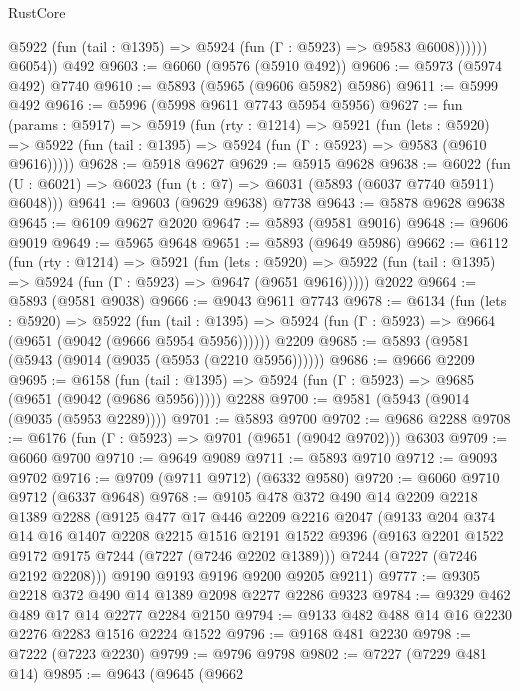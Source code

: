 \begin{lexlean}{RustCore}
\begin{coremodule}
              @5922 (fun (tail : @1395) => @5924 (fun (Γ : @5923) => @9583 @6008))))))
        @6054))
    @492
@9603 := @6060 (@9576 (@5910 @492))
@9606 := @5973 (@5974 @492) @7740
@9610 := @5893 (@5965 (@9606 @5982) @5986)
@9611 := @5999 @492
@9616 := @5996 (@5998 @9611 @7743 @5954 @5956)
@9627 := fun (params : @5917) =>
  @5919
    (fun (rty : @1214) =>
    @5921
      (fun (lets : @5920) =>
      @5922 (fun (tail : @1395) => @5924 (fun (Γ : @5923) => @9583 (@9610 @9616)))))
@9628 := @5918 @9627
@9629 := @5915 @9628
@9638 := @6022 (fun (U : @6021) => @6023 (fun (t : @7) => @6031 (@5893 (@6037 @7740 @5911) @6048)))
@9641 := @9603 (@9629 @9638) @7738
@9643 := @5878 @9628 @9638
@9645 := @6109 @9627 @2020
@9647 := @5893 (@9581 @9016)
@9648 := @9606 @9019
@9649 := @5965 @9648
@9651 := @5893 (@9649 @5986)
@9662 := @6112
    (fun (rty : @1214) =>
    @5921
      (fun (lets : @5920) =>
      @5922 (fun (tail : @1395) => @5924 (fun (Γ : @5923) => @9647 (@9651 @9616)))))
    @2022
@9664 := @5893 (@9581 @9038)
@9666 := @9043 @9611 @7743
@9678 := @6134
    (fun (lets : @5920) =>
    @5922
      (fun (tail : @1395) => @5924 (fun (Γ : @5923) => @9664 (@9651 (@9042 (@9666 @5954 @5956))))))
    @2209
@9685 := @5893 (@9581 (@5943 (@9014 (@9035 (@5953 (@2210 @5956))))))
@9686 := @9666 @2209
@9695 := @6158
    (fun (tail : @1395) => @5924 (fun (Γ : @5923) => @9685 (@9651 (@9042 (@9686 @5956)))))
    @2288
@9700 := @9581 (@5943 (@9014 (@9035 (@5953 @2289))))
@9701 := @5893 @9700
@9702 := @9686 @2288
@9708 := @6176 (fun (Γ : @5923) => @9701 (@9651 (@9042 @9702))) @6303
@9709 := @6060 @9700
@9710 := @9649 @9089
@9711 := @5893 @9710
@9712 := @9093 @9702
@9716 := @9709 (@9711 @9712) (@6332 @9580)
@9720 := @6060 @9710 @9712 (@6337 @9648)
@9768 := @9105
    @478
    @372
    @490
    @14
    @2209
    @2218
    @1389
    @2288
    (@9125
      @477
      @17
      @446
      @2209
      @2216
      @2047
      (@9133
        @204
        @374
        @14
        @16
        @1407
        @2208
        @2215
        @1516
        @2191
        @1522
        @9396
        (@9163 @2201 @1522 @9172 @9175 @7244 (@7227 (@7246 @2202 @1389)))
        @7244
        (@7227 (@7246 @2192 @2208)))
      @9190
      @9193
      @9196
      @9200
      @9205
      @9211)
@9777 := @9305 @2218 @372 @490 @14 @1389 @2098 @2277 @2286 @9323
@9784 := @9329 @462 @489 @17 @14 @2277 @2284 @2150
@9794 := @9133 @482 @488 @14 @16 @2230 @2276 @2283 @1516 @2224 @1522
@9796 := @9168 @481 @2230
@9798 := @7222 (@7223 @2230)
@9799 := @9796 @9798
@9802 := @7227 (@7229 @481 @14)
@9895 := @9643
    (@9645
      (@9662

\end{coremodule}
\end{lexlean}

